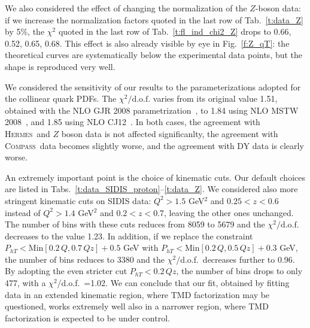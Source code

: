 \documentclass[aps,preprintnumbers,showpacs,nofootinbib,superscriptaddress,floatfix]{revtex4}
\newcommand{\hermes}{\textsc{Hermes}}
\newcommand{\compass}{\textsc{Compass}}
\begin{document}
We also considered the effect of changing the normalization of the $Z$-boson
data: if we increase the normalization factors quoted
in the last row of Tab.~\ref{t:data_Z} by 5\%, the $\chi^2$ quoted in the last
row of Tab.~\ref{t:fl_ind_chi2_Z}
drops to 0.66, 
0.52, 0.65, 0.68. This effect is
also already visible by eye in Fig.~\ref{f:Z_qT}: the theoretical curves are
systematically below the experimental data points, but the shape is reproduced
very well.

We considered the sensitivity of our results to the %
 parameterizations adopted for the collinear quark PDFs. 
The $\chi^2/ \text{d.o.f.}$ varies from its original value
1.51, obtained with the NLO GJR 2008 parametrization~\cite{Gluck:2007ck}, to
1.84 using NLO MSTW 2008~\cite{Martin:2009iq}, and 1.85 using NLO
CJ12~\cite{Owens:2012bv}. In both cases, the agreement with \hermes\
and $Z$ boson data is not affected significanlty,
 the agreement with \compass\ data becomes slightly worse, 
and the agreement with DY data is clearly worse. 

An extremely important point is the choice of kinematic cuts. Our default
choices are listed in Tabs.~\ref{t:data_SIDIS_proton}--\ref{t:data_Z}. We
considered also more stringent kinematic cuts on SIDIS data: 
$Q^2 > 1.5$ GeV$^2$ and 
$0.25 < z < 0.6$ instead of $Q^2 > 1.4$ GeV$^2$ and $0.2 < z <
0.7$, leaving the other ones unchanged. The number of bins with these cuts 
reduces from 8059 to 5679 and 
the  $\chi^2/ \text{d.o.f.}$  decreases to the
value 1.23. 
In addition, if we replace the constraint  $P_{h T} < \text{Min} [
0.2\, Q, 0.7\, Q z] + 0.5$ GeV  
with $P_{h T} < \text{Min} [ 0.2\, Q, 0.5\, Q z] +
0.3$ GeV, the number of bins reduces to 3380 and the $\chi^2/$d.o.f.\ decreases
further to 0.96. By adopting the even stricter 
cut $P_{h T} < 0.2\, Q z$, 
the number of bins drops to only 477, with  a 
 $\chi^2$/d.o.f.\ =1.02.  We can conclude that our fit, obtained by
 fitting data in an extended kinematic region, where TMD factorization may be
 questioned,  works extremely well also in a narrower
 region, where TMD factorization is expected to be under control.


%
%
\end{document}
